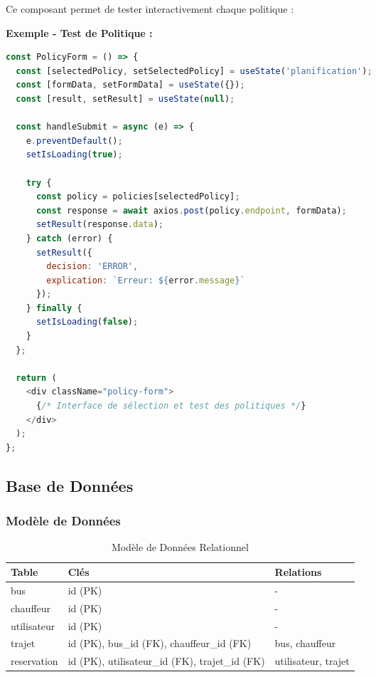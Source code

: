 \documentclass[12pt,a4paper]{article}
\begin{document}
    Ce composant permet de tester interactivement chaque politique :

    \begin{codebox}
        \textbf{Exemple - Test de Politique :}
        \begin{lstlisting}[language=JavaScript]
const PolicyForm = () => {
  const [selectedPolicy, setSelectedPolicy] = useState('planification');
  const [formData, setFormData] = useState({});
  const [result, setResult] = useState(null);

  const handleSubmit = async (e) => {
    e.preventDefault();
    setIsLoading(true);

    try {
      const policy = policies[selectedPolicy];
      const response = await axios.post(policy.endpoint, formData);
      setResult(response.data);
    } catch (error) {
      setResult({
        decision: 'ERROR',
        explication: `Erreur: ${error.message}`
      });
    } finally {
      setIsLoading(false);
    }
  };

  return (
    <div className="policy-form">
      {/* Interface de sélection et test des politiques */}
    </div>
  );
};
        \end{lstlisting}
    \end{codebox}

    \subsection{Base de Données}

    \subsubsection{Modèle de Données}

    \begin{table}[H]
        \centering
        \begin{tabular}{|l|l|l|}
            \hline
            \textbf{Table} & \textbf{Clés} & \textbf{Relations} \\
            \hline
            bus & id (PK) & - \\
            chauffeur & id (PK) & - \\
            utilisateur & id (PK) & - \\
            trajet & id (PK), bus\_id (FK), chauffeur\_id (FK) & bus, chauffeur \\
            reservation & id (PK), utilisateur\_id (FK), trajet\_id (FK) & utilisateur, trajet \\
            \hline
        \end{tabular}
        \caption{Modèle de Données Relationnel}
    \end{table}
\end{document}
